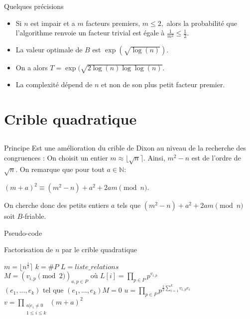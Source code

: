 \documentclass[utf8,10pt,french]{beamer}
\newcommand{\N}{\mathbb{N}}
\DeclareMathOperator{\pgcd}{pgcd}
\begin{document}
\begin{frame}{Quelques précisions}
\begin{itemize}
\item Si $n$ est impair et a $m$ facteurs premiers, $m \leq 2,$ alors la probabilité que l'algorithme renvoie un facteur trivial est égale à $\frac{1}{m^2} \leq \frac{1}{2}.$ \pause
\item La valeur optimale de $B$ est $\exp(\sqrt{\log(n)}).$
\item On a alors $T = \exp(\sqrt{2\log(n)\log\log(n)}.$
\item La complexité dépend de $n$ et non de son plus petit facteur premier.  
\end{itemize}
\end{frame}

\section{Crible quadratique}
\subsection{}
\begin{frame}{Principe}
Est une amélioration du crible de Dixon au niveau de la recherche des congruences : \pause
On choisit un entier $m \approx \lfloor\sqrt{n}\rceil.$ Ainsi, $m^2 - n$ est de l'ordre de $\sqrt{n}.$ \pause
On remarque que pour tout $a \in \N :$
\begin{center}
$(m + a)^2 \equiv (m^2 - n) + a^2 + 2am \pmod n.$
\end{center} \pause
On cherche donc des petits entiers $a$ tels que $(m^2 - n) + a^2 + 2am \pmod n$ soit $B$-friable.
\end{frame}

\begin{frame}{Pseudo-code}
\begin{algorithm}[H]
\caption{Factorisation de $n$ par le crible quadratique}
\BlankLine
$m = \lfloor n^{\frac{1}{2}} \rceil$\;
$k = \#P$\;
$L = liste\_relations$\;
$M = (v_{i, p} \pmod 2)_{a, p \in P} \text{ où } L[i] = \prod\limits_{p \in P}p^{v_{i,p}}$\;
$(e_1, ..., e_k) \text{ tel que } (e_1, ..., e_k)M = 0$\;
$u = \prod\limits_{p \in P} p^{\frac{1}{2} \sum\limits_{i=1}^k v_{i, p}e_i}$\;
$v = \prod\limits_{\substack{a | e_i \neq 0 \\ 1 \leq i \leq k}} (m + a)^2$\;
\Return{$\pgcd(u - v, n)$}
\end{algorithm}
\end{frame}
\end{document}

